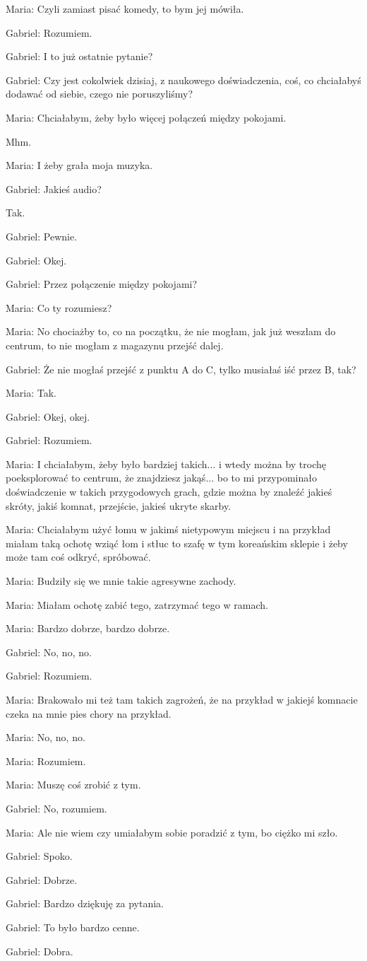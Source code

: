 Maria: Czyli zamiast pisać komedy, to bym jej mówiła.

Gabriel: Rozumiem.

Gabriel: I to już ostatnie pytanie?

Gabriel: Czy jest cokolwiek dzisiaj, z naukowego doświadczenia, coś, co chciałabyś dodawać od siebie, czego nie poruszyliśmy?

Maria: Chciałabym, żeby było więcej połączeń między pokojami.

Mhm.

Maria: I żeby grała moja muzyka.

Gabriel: Jakieś audio?

Tak.

Gabriel: Pewnie.

Gabriel: Okej.

Gabriel: Przez połączenie między pokojami?

Maria: Co ty rozumiesz?

Maria: No chociażby to, co na początku, że nie mogłam, jak już weszłam do centrum, to nie mogłam z magazynu przejść dalej.

Gabriel: Że nie mogłaś przejść z punktu A do C, tylko musiałaś iść przez B, tak?

Maria: Tak.

Gabriel: Okej, okej.

Gabriel: Rozumiem.

Maria: I chciałabym, żeby było bardziej takich... i wtedy można by trochę poeksplorować to centrum, że znajdziesz jakąś... bo to mi przypominało doświadczenie w takich przygodowych grach, gdzie można by znaleźć jakieś skróty, jakiś komnat, przejście, jakieś ukryte skarby.

Maria: Chciałabym użyć łomu w jakimś nietypowym miejscu i na przykład miałam taką ochotę wziąć łom i stłuc to szafę w tym koreańskim sklepie i żeby może tam coś odkryć, spróbować.

Maria: Budziły się we mnie takie agresywne zachody.

Maria: Miałam ochotę zabić tego, zatrzymać tego w ramach.

Maria: Bardzo dobrze, bardzo dobrze.

Gabriel: No, no, no.

Gabriel: Rozumiem.

Maria: Brakowało mi też tam takich zagrożeń, że na przykład w jakiejś komnacie czeka na mnie pies chory na przykład.

Maria: No, no, no.

Maria: Rozumiem.

Maria: Muszę coś zrobić z tym.

Gabriel: No, rozumiem.

Maria: Ale nie wiem czy umiałabym sobie poradzić z tym, bo ciężko mi szło.

Gabriel: Spoko.

Gabriel: Dobrze.

Gabriel: Bardzo dziękuję za pytania.

Gabriel: To było bardzo cenne.

Gabriel: Dobra.







